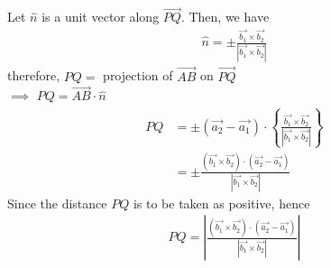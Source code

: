 \documentclass[12pt]{article}
\begin{document}
\noindent
Let $\hat{n}$ is a unit vector along $\overrightarrow{PQ}$. Then, we have
\begin{align*}
\hat{n} =\pm \frac{ \overrightarrow{b_1} \times \overrightarrow{b_2} }{
|\overrightarrow{b_1} \times \overrightarrow{b_2}| }
\end{align*}
therefore, \hfill $PQ =$ projection of $\overrightarrow{AB}$ on
	$\overrightarrow{PQ}$  \hfill ~\\

\noindent
$\implies$ \hfill $PQ =\overrightarrow{AB} \cdot \hat{n}$ \hfill ~\\
\begin{align}
PQ &= \pm ( \overrightarrow{a_2} - \overrightarrow{a_1}) \cdot
\left\{ \frac{ \overrightarrow{b_1} \times \overrightarrow{b_2} }{
	|\overrightarrow{b_1} \times \overrightarrow{b_2}| } \right\} \\
   &= \pm 
	\frac{ (\overrightarrow{b_1} \times \overrightarrow{b_2} ) \cdot
	( \overrightarrow{a_2} - \overrightarrow{a_1}) }{
	|\overrightarrow{b_1} \times \overrightarrow{b_2}| }  \nonumber
\end{align}
Since the distance $PQ$ is to be taken as positive, hence
\begin{align}
PQ = \left| \frac{ (\overrightarrow{b_1} \times \overrightarrow{b_2} ) \cdot
	( \overrightarrow{a_2} - \overrightarrow{a_1}) }{
	|\overrightarrow{b_1} \times \overrightarrow{b_2}| } \right|
\end{align}
\end{document}
